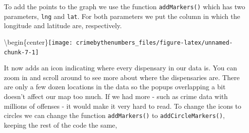 \documentclass[
  12pt,
  openany]{book}
\newenvironment{Shaded}{\begin{snugshade}}{\end{snugshade}}
\newcommand{\AttributeTok}[1]{\textcolor[rgb]{0.61,0.61,0.61}{#1}}
\newcommand{\FunctionTok}[1]{\textcolor[rgb]{0,0,0}{#1}}
\newcommand{\NormalTok}[1]{#1}
\newcommand{\SpecialCharTok}[1]{\textcolor[rgb]{0,0,0}{#1}}
\newcommand{\StringTok}[1]{\textcolor[rgb]{0.5,0.5,0.5}{#1}}
\begin{document}
To add the points to the graph we use the function \texttt{addMarkers()} which has two parameters, \texttt{lng} and \texttt{lat}. For both parameters we put the column in which the longitude and latitude are, respectively.

\begin{Shaded}
\end{Shaded}

\textbackslash begin\{center\}\texttt{[image: crimebythenumbers\_files/figure-latex/unnamed-chunk-7-1]}

It now adds an icon indicating where every dispensary in our data is. You can zoom in and scroll around to see more about where the dispensaries are. There are only a few dozen locations in the data so the popups overlapping a bit doesn't affect our map too much. If we had more - such as crime data with millions of offenses - it would make it very hard to read. To change the icons to circles we can change the function \texttt{addMarkers()} to \texttt{addCircleMarkers()}, keeping the rest of the code the same,

\begin{Shaded}
\end{Shaded}
\end{document}
